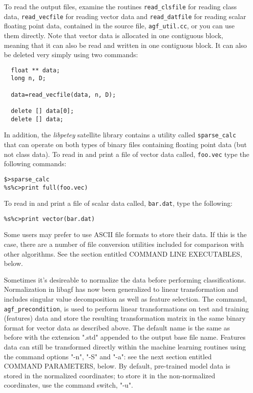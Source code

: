 \documentclass[12pt]{article}
\begin{document}
To read the output files, examine the routines \verb"read_clsfile" for reading class data, \verb"read_vecfile" for reading vector data and \verb"read_datfile" for reading scalar floating point data, contained in the source file, \verb"agf_util.cc", or you can use them directly.  Note that vector data is allocated in one contiguous block, meaning that it can also be read and written in one contiguous block.  It can also be deleted very simply using two commands:

\begin{verbatim}
  float ** data;
  long n, D;

  data=read_vecfile(data, n, D);

  delete [] data[0];
  delete [] data;
\end{verbatim}

In addition, the {\it libpetey} satellite library contains a utility called \verb/sparse_calc/ that can operate on both types of binary files containing floating point data (but not class data).  To read in and print a file of vector data called, \verb"foo.vec" type the following commands:

\begin{verbatim}
$>sparse_calc
%s%c>print full(foo.vec)
\end{verbatim}

To read in and print a file of scalar data called, \verb"bar.dat", type the following:

\begin{verbatim}
%s%c>print vector(bar.dat)
\end{verbatim}

Some users may prefer to use ASCII file formats to store their data.  If this is the case, there are a number of file conversion utilities included for comparison with other algorithms.  See the section entitled COMMAND LINE EXECUTABLES, below.

Sometimes it's desireable to normalize the data before performing classifications.  Normalization in libagf has now been generalized to linear transformation and includes singular value decomposition as well as feature selection.  The command, \verb"agf_precondition", is used to perform linear transformations on test and training (features) data and store the resulting transformation matrix in the same binary format for vector data as described above.  The default name is the same as before with the extension ".std" appended to the output base file name.  Features data can still be transformed directly within the machine learning routines using the command options "-n", "-S" and "-a": see the next section entitled COMMAND PARAMETERS, below.  By default, pre-trained model data is stored in the normalized coordinates; to store it in the non-normalized coordinates, use the command switch, "-u".
\end{document}
